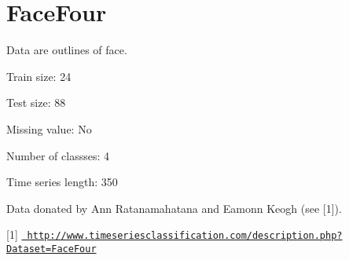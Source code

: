 \chapter{Face\+Four}
\hypertarget{md_external_2data_2UCRArchive__2018_2FaceFour_2README}{}\label{md_external_2data_2UCRArchive__2018_2FaceFour_2README}
\label{md_external_2data_2UCRArchive__2018_2FaceFour_2README_autotoc_md70}%
%
 Data are outlines of face.

Train size\+: 24

Test size\+: 88

Missing value\+: No

Number of classses\+: 4

Time series length\+: 350

Data donated by Ann Ratanamahatana and Eamonn Keogh (see \mbox{[}1\mbox{]}).

\mbox{[}1\mbox{]} \href{http://www.timeseriesclassification.com/description.php?Dataset=FaceFour}{\texttt{ http\+://www.\+timeseriesclassification.\+com/description.\+php?\+Dataset=\+Face\+Four}} 